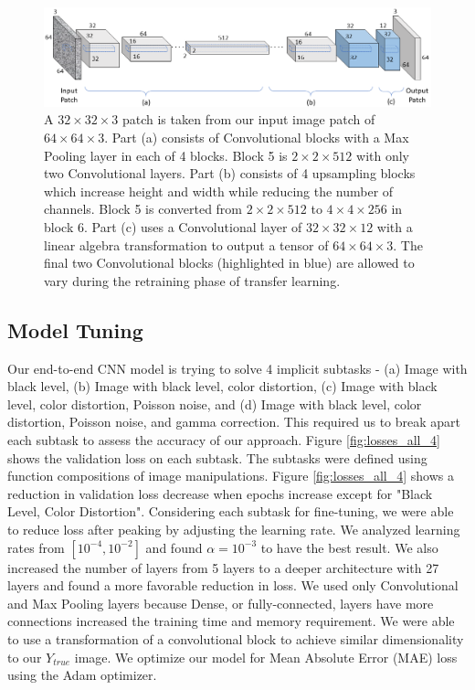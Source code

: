 \documentclass{article}
\begin{document}
\begin{figure}[ht]
  \centering
  \includegraphics[scale=0.4]{model}
  \caption{A $32 \times 32 \times 3$ patch is taken from our input image patch of $64 \times 64 \times 3$. Part (a) consists of Convolutional blocks with a Max Pooling layer in each of 4 blocks. Block 5 is $2 \times 2 \times 512$ with only two Convolutional layers. Part (b) consists of 4 upsampling blocks which increase height and width while reducing the number of channels. Block 5 is converted from $2 \times 2 \times 512$ to $4 \times 4 \times 256$ in block 6. Part (c) uses a Convolutional layer of $32 \times 32 \times 12$ with a linear algebra transformation to output a tensor of $64 \times 64 \times 3$. The final two Convolutional blocks (highlighted in blue) are allowed to vary during the retraining phase of transfer learning.}
  \label{fig:model}
\end{figure}


\subsection{Model Tuning}

Our end-to-end CNN model is trying to solve 4 implicit subtasks - (a) Image with black level, (b) Image with black level, color distortion, (c) Image with black level, color distortion, Poisson noise, and (d) Image with black level, color distortion, Poisson noise, and gamma correction. This required us to break apart each subtask to assess the accuracy of our approach. Figure \ref{fig:losses_all_4} shows the validation loss on each subtask. The subtasks were defined using function compositions of image manipulations. Figure \ref{fig:losses_all_4} shows a reduction in validation loss decrease when epochs increase except for "Black Level, Color Distortion". Considering each subtask for fine-tuning, we were able to reduce loss after peaking by adjusting the learning rate. We analyzed learning rates from $[10^{-4}, 10^{-2}]$ and found $\alpha = 10^{-3}$ to have the best result. We also increased the number of layers from 5 layers to a deeper architecture with 27 layers and found a more favorable reduction in loss. We used only Convolutional and Max Pooling layers because Dense, or fully-connected, layers have more connections increased the training time and memory requirement. We were able to use a transformation of a convolutional block to achieve similar dimensionality to our $Y_{true}$ image. We optimize our model for Mean Absolute Error (MAE) loss using the Adam optimizer. 
\end{document}
